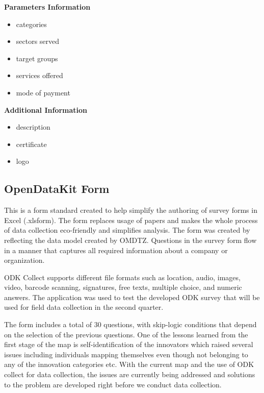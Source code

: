 \documentclass[a4paper,12pt,twoside]{article}
\begin{document}
\begin{multicols}{3}
\begin{mdframed}[hidealllines=true,backgroundcolor=OMDTZgreen!10,innerleftmargin=6pt,innerrightmargin=6pt,leftmargin=-3pt,rightmargin=-3pt]
\textbf {Parameters Information}
\begin{itemize}
    \item categories 
    \item sectors served
    \item target groups
    \item services offered
    \item mode of payment
\end{itemize}
\textbf {Additional Information}
\begin{itemize}
    \item description
    \item certificate
    \item logo
    \vfill\null
\end{itemize}
\end{mdframed}
\end{multicols}


\subsection{OpenDataKit Form}
This is a form standard created to help simplify the authoring of survey forms in Excel (.xlsform). The form replaces usage of papers and makes the whole process of data collection eco-friendly and simplifies analysis. The form was created by reflecting the data model created by OMDTZ. Questions in the survey form flow in a manner that captures all required information about a company or organization.
\medskip

ODK Collect supports different file formats such as location, audio, images, video, barcode scanning, signatures, free texts, multiple choice, and numeric answers. The application was used to test the developed ODK survey that will be used for field data collection in the second quarter.
\medskip

The form includes a total of 30 questions, with skip-logic conditions that depend on the selection of the previous questions. One of the lessons learned from the first stage of the map is self-identification of the innovators which raised several issues including individuals mapping themselves even though not belonging to any of the innovation categories etc. With the current map and the use of ODK collect for data collection, the issues are currently being addressed and solutions to the problem are developed right before we conduct data collection.
\medskip
\end{document}
